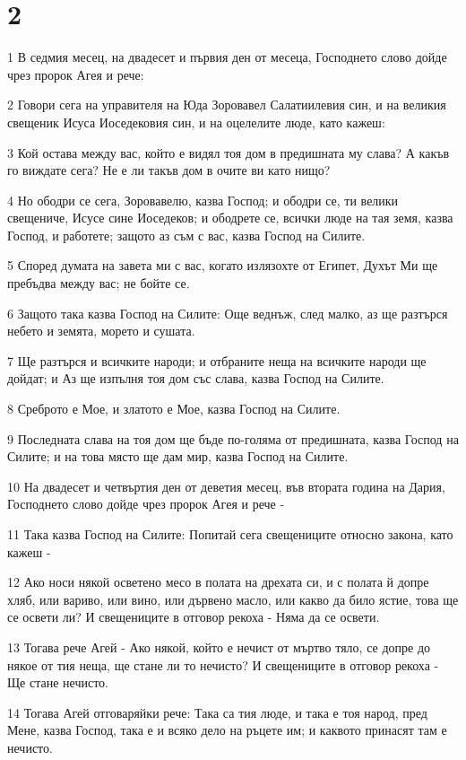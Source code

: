\chapter{2}

\par 1 В седмия месец, на двадесет и първия ден от месеца, Господнето слово дойде чрез пророк Агея и рече:
\par 2 Говори сега на управителя на Юда Зоровавел Салатиилевия син, и на великия свещеник Исуса Иоседековия син, и на оцелелите люде, като кажеш:
\par 3 Кой остава между вас, който е видял тоя дом в предишната му слава? А какъв го виждате сега? Не е ли такъв дом в очите ви като нищо?
\par 4 Но ободри се сега, Зоровавелю, казва Господ; и ободри се, ти велики свещениче, Исусе сине Иоседеков; и ободрете се, всички люде на тая земя, казва Господ, и работете; защото аз съм с вас, казва Господ на Силите.
\par 5 Според думата на завета ми с вас, когато излязохте от Египет, Духът Ми ще пребъдва между вас; не бойте се.
\par 6 Защото така казва Господ на Силите: Още веднъж, след малко, аз ще разтърся небето и земята, морето и сушата.
\par 7 Ще разтърся и всичките народи; и отбраните неща на всичките народи ще дойдат; и Аз ще изпълня тоя дом със слава, казва Господ на Силите.
\par 8 Среброто е Мое, и златото е Мое, казва Господ на Силите.
\par 9 Последната слава на тоя дом ще бъде по-голяма от предишната, казва Господ на Силите; и на това място ще дам мир, казва Господ на Силите.
\par 10 На двадесет и четвъртия ден от деветия месец, във втората година на Дария, Господнето слово дойде чрез пророк Агея и рече -
\par 11 Така казва Господ на Силите: Попитай сега свещениците относно закона, като кажеш -
\par 12 Ако носи някой осветено месо в полата на дрехата си, и с полата й допре хляб, или вариво, или вино, или дървено масло, или какво да било ястие, това ще се освети ли? И свещениците в отговор рекоха - Няма да се освети.
\par 13 Тогава рече Агей - Ако някой, който е нечист от мъртво тяло, се допре до някое от тия неща, ще стане ли то нечисто? И свещениците в отговор рекоха - Ще стане нечисто.
\par 14 Тогава Агей отговаряйки рече: Така са тия люде, и така е тоя народ, пред Мене, казва Господ, така е и всяко дело на ръцете им; и каквото принасят там е нечисто.
